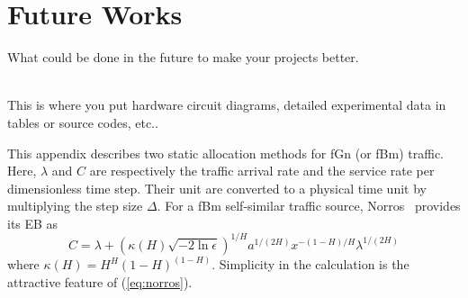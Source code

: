 \documentclass[12pt,oneside,openright,a4paper]{explo-english-project}
\begin{document}
\section{Future Works}
What could be done in the future to make your projects better.



\makeatletter
\g@addto@macro{\UrlBreaks}{\UrlOrds}
\makeatother





 \\

This is where you put hardware circuit diagrams, detailed experimental data in tables or source codes, etc.. \\ \bigskip



This appendix describes two static allocation methods for fGn (or fBm)
traffic. Here, $\lambda$ and $C$ are respectively the traffic arrival
rate and the service rate per dimensionless time step. Their unit are
converted to a physical time unit by multiplying the step size
$\Delta$. For a fBm self-similar traffic source,
Norros~\cite{norros95} provides its EB as
\begin{equation}\label{eq:norros}
  C = \lambda + (\kappa(H)\sqrt{-2\ln\epsilon})^{1/H}a^{1/(2H)}x^{-(1-H)/H}\lambda^{1/(2H)}
\end{equation}
where $\kappa(H) = H^H(1-H)^{(1-H)}$. Simplicity in the calculation is
the attractive feature of (\ref{eq:norros}).
\end{document}
